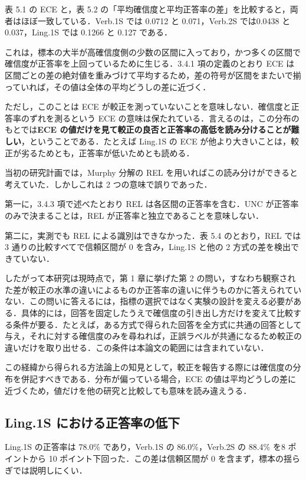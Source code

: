 表 5.1 の ECE と，表 5.2 の「平均確信度と平均正答率の差」を比較すると，両者はほぼ一致している．Verb.1S では 0.0712 と 0.071，Verb.2S では0.0438 と 0.037，Ling.1S では 0.1266 と 0.127 である．

これは，標本の大半が高確信度側の少数の区間に入っており，かつ多くの区間で確信度が正答率を上回っているために生じる．3.4.1 項の定義のとおり ECE は区間ごとの差の絶対値を重みづけて平均するため，差の符号が区間をまたいで揃っていれば，その値は全体の平均どうしの差に近づく．

ただし，このことは ECE が較正を測っていないことを意味しない．確信度と正答率のずれを測るという ECE の意味は保たれている．言えるのは，この分布のもとでは\textbf{ECE の値だけを見て較正の良否と正答率の高低を読み分けることが難しい}，ということである．たとえば Ling.1S の ECE が他より大きいことは，較正が劣るためとも，正答率が低いためとも読める．

当初の研究計画では，Murphy 分解の REL を用いればこの読み分けができると考えていた．しかしこれは 2 つの意味で誤りであった．

第一に，3.4.3 項で述べたとおり REL は各区間の正答率を含む．UNC が正答率のみで決まることは，REL が正答率と独立であることを意味しない．

第二に，実測でも REL による識別はできなかった．表 5.4 のとおり，REL では3 通りの比較すべてで信頼区間が 0 を含み，Ling.1S と他の 2 方式の差を検出できていない．

したがって本研究は現時点で，第 1 章に挙げた第 2 の問い，すなわち観察された差が較正の水準の違いによるものか正答率の違いに伴うものかに答えられていない．この問いに答えるには，指標の選択ではなく実験の設計を変える必要がある．具体的には，回答を固定したうえで確信度の引き出し方だけを変えて比較する条件が要る．たとえば，ある方式で得られた回答を全方式に共通の回答として与え，それに対する確信度のみを尋ねれば，正誤ラベルが共通になるため較正の違いだけを取り出せる．この条件は本論文の範囲には含まれていない．

この経緯から得られる方法論上の知見として，較正を報告する際には確信度の分布を併記すべきである．分布が偏っている場合，ECE の値は平均どうしの差に近づくため，値だけを他の研究と比較しても意味を読み違えうる．

\subsection{Ling.1S における正答率の低下}

Ling.1S の正答率は 78.0\% であり，Verb.1S の 86.0\%，Verb.2S の 88.4\% を8 ポイントから 10 ポイント下回った．この差は信頼区間が 0 を含まず，標本の揺らぎでは説明しにくい．


